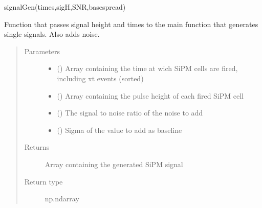 \documentclass[letterpaper,10pt,english]{sphinxmanual}
\begin{document}
\begin{fulllineitems}
\label{\detokenize{structure:libs.lib.SiPMSignalAction}}
signalGen(times,sigH,SNR,basespread)

Function that passes signal height and times to the main function that generates single signals. Also adds noise.
\begin{quote}\begin{description}
\item[{Parameters}] \leavevmode\begin{itemize}
\item {} 
 (\sphinxstyleliteralemphasis{\sphinxupquote{(}}\sphinxstyleliteralemphasis{\sphinxupquote{)}}) \textendash{} Array containing the time at wich SiPM cells are fired, including xt events (sorted)

\item {} 
 (\sphinxstyleliteralemphasis{\sphinxupquote{(}}\sphinxstyleliteralemphasis{\sphinxupquote{)}}) \textendash{} Array containing the pulse height of each fired SiPM cell

\item {} 
 () \textendash{} The signal to noise ratio of the noise to add

\item {} 
 () \textendash{} Sigma of the value to add as baseline

\end{itemize}

\item[{Returns}] \leavevmode
{} \textendash{} Array containing the generated SiPM signal

\item[{Return type}] \leavevmode
np.ndarray

\end{description}\end{quote}

\end{fulllineitems}
\end{document}
